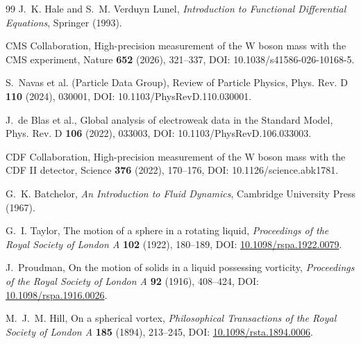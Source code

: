 \documentclass[11pt]{article}
\theoremstyle{definition}
\theoremstyle{plain}
\theoremstyle{remark}
\begin{document}
\begin{thebibliography}{99}
            J.~K. Hale and S.~M. Verduyn Lunel,
            \newblock \emph{Introduction to Functional Differential Equations},
            \newblock Springer (1993).
            
            CMS Collaboration,
            \newblock High-precision measurement of the W boson mass with the CMS experiment,
            \newblock Nature \textbf{652} (2026), 321--337,
            \newblock DOI: 10.1038/s41586-026-10168-5.
            
            S.~Navas et al. (Particle Data Group),
            \newblock Review of Particle Physics,
            \newblock Phys. Rev. D \textbf{110} (2024), 030001,
            \newblock DOI: 10.1103/PhysRevD.110.030001.
            
            J.~de Blas et al.,
            \newblock Global analysis of electroweak data in the Standard Model,
            \newblock Phys. Rev. D \textbf{106} (2022), 033003,
            \newblock DOI: 10.1103/PhysRevD.106.033003.
            
            CDF Collaboration,
            \newblock High-precision measurement of the W boson mass with the CDF II detector,
            \newblock Science \textbf{376} (2022), 170--176,
            \newblock DOI: 10.1126/science.abk1781.
            
            G.~K. Batchelor,
            \newblock \emph{An Introduction to Fluid Dynamics},
            \newblock Cambridge University Press (1967).

            G.~I. Taylor,
            \newblock The motion of a sphere in a rotating liquid,
            \newblock \emph{Proceedings of the Royal Society of London A} \textbf{102} (1922), 180--189,
            \newblock DOI: \href{https://doi.org/10.1098/rspa.1922.0079}{10.1098/rspa.1922.0079}.

            J.~Proudman,
            \newblock On the motion of solids in a liquid possessing vorticity,
            \newblock \emph{Proceedings of the Royal Society of London A} \textbf{92} (1916), 408--424,
            \newblock DOI: \href{https://doi.org/10.1098/rspa.1916.0026}{10.1098/rspa.1916.0026}.

            M.~J.~M. Hill,
            \newblock On a spherical vortex,
            \newblock \emph{Philosophical Transactions of the Royal Society of London A} \textbf{185} (1894), 213--245,
            \newblock DOI: \href{https://doi.org/10.1098/rsta.1894.0006}{10.1098/rsta.1894.0006}.


\end{thebibliography}
\end{document}
